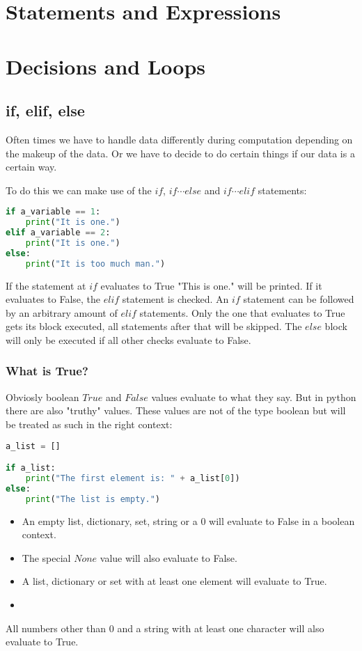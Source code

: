 \documentclass{article}
\begin{document}
\section{Statements and Expressions}
\section{Decisions and Loops}

\subsection{if, elif, else}

Often times we have to handle data differently during computation depending on
the makeup of the data.
Or we have to decide to do certain things if our data is a certain way.

To do this we can make use of the $if$, $if\cdots else$ and $if\cdots elif$
statements:

\begin{lstlisting}[language=Python]
if a_variable == 1:
    print("It is one.")
elif a_variable == 2:
    print("It is one.")
else:
    print("It is too much man.")
\end{lstlisting}

If the statement at $if$ evaluates to True "This is one." will be printed.
If it evaluates to False, the $elif$ statement is checked.
An $if$ statement can be followed by an arbitrary amount of $elif$ statements.
Only the one that evaluates to True gets its block executed, all statements
after that will be skipped.
The $else$ block will only be executed if all other checks evaluate to False.

\subsubsection{What is True?}

Obviosly boolean $True$ and $False$ values evaluate to what they say.
But in python there are also "truthy" values.
These values are not of the type boolean but will be treated as such in the right context:

\begin{lstlisting}[language=Python]
a_list = []

if a_list:
    print("The first element is: " + a_list[0])
else:
    print("The list is empty.")
\end{lstlisting}

\begin{itemize}
    \item An empty list, dictionary, set, string or a 0 will evaluate to False in a boolean context.
    \item The special $None$ value will also evaluate to False. 
    \item A list, dictionary or set with at least one element will evaluate to True.
    \item 
\end{itemize}
All numbers other than 0 and a string with at least one character will also evaluate to True.
\end{document}
